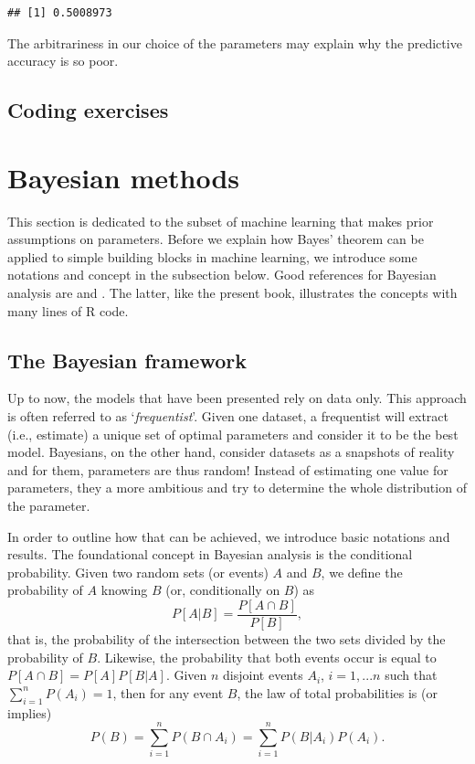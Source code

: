 \documentclass[]{krantz}
\theoremstyle{definition}
\theoremstyle{definition}
\theoremstyle{definition}
\theoremstyle{remark}
\begin{document}
\begin{verbatim}
## [1] 0.5008973
\end{verbatim}

\normalsize

The arbitrariness in our choice of the parameters may explain why the
predictive accuracy is so poor.

\hypertarget{coding-exercises-5}{%
\section{Coding exercises}\label{coding-exercises-5}}

\hypertarget{bayes}{%
\chapter{Bayesian methods}\label{bayes}}

This section is dedicated to the subset of machine learning that makes
prior assumptions on parameters. Before we explain how Bayes' theorem
can be applied to simple building blocks in machine learning, we
introduce some notations and concept in the subsection below. Good
references for Bayesian analysis are \citet{gelman2013bayesian} and
\citet{kruschke2014doing}. The latter, like the present book,
illustrates the concepts with many lines of R code.

\hypertarget{the-bayesian-framework}{%
\section{The Bayesian framework}\label{the-bayesian-framework}}

Up to now, the models that have been presented rely on data only. This
approach is often referred to as `\emph{frequentist}'. Given one
dataset, a frequentist will extract (i.e., estimate) a unique set of
optimal parameters and consider it to be the best model. Bayesians, on
the other hand, consider datasets as a snapshots of reality and for
them, parameters are thus random! Instead of estimating one value for
parameters, they a more ambitious and try to determine the whole
distribution of the parameter.

In order to outline how that can be achieved, we introduce basic
notations and results. The foundational concept in Bayesian analysis is
the conditional probability. Given two random sets (or events) \(A\) and
\(B\), we define the probability of \(A\) knowing \(B\) (or,
conditionally on \(B\)) as \[P[A|B]=\frac{P[A \cap B]}{P[B]},\] that is,
the probability of the intersection between the two sets divided by the
probability of \(B\). Likewise, the probability that both events occur
is equal to \(P[A \cap B] = P[A]P[B|A]\). Given \(n\) disjoint events
\(A_i\), \(i=1,...n\) such that \(\sum_{i=1}^nP(A_i)=1\), then for any
event \(B\), the law of total probabilities is (or implies)
\[P(B)=\sum_{i=1}^nP(B \cap A_i)= \sum_{i=1}^nP(B|A_i)P(A_i).\]
\end{document}
